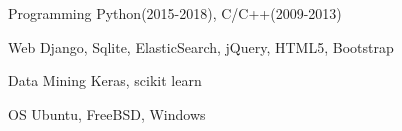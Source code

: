 

\begin{cvskills}

  \cvskill
    {Programming} %
    {Python(2015-2018), C/C++(2009-2013)} %

  \cvskill
    {Web} %
    {Django, Sqlite, ElasticSearch, jQuery, HTML5, Bootstrap} %

  \cvskill
    {Data Mining} %
    {Keras, scikit learn} %

  \cvskill
    {OS} %
    {Ubuntu, FreeBSD, Windows} %

\end{cvskills}
